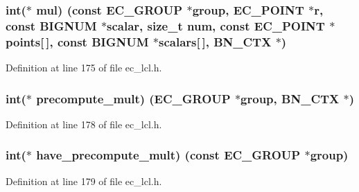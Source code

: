 \subsubsection[{\texorpdfstring{mul}{mul}}]{\setlength{\rightskip}{0pt plus 5cm}int($\ast$ mul) (const {\bf E\+C\+\_\+\+G\+R\+O\+UP} $\ast$group, {\bf E\+C\+\_\+\+P\+O\+I\+NT} $\ast$r, const {\bf B\+I\+G\+N\+UM} $\ast$scalar, size\+\_\+t {\bf num}, const {\bf E\+C\+\_\+\+P\+O\+I\+NT} $\ast$points\mbox{[}$\,$\mbox{]}, const {\bf B\+I\+G\+N\+UM} $\ast$scalars\mbox{[}$\,$\mbox{]}, {\bf B\+N\+\_\+\+C\+TX} $\ast$)}\hypertarget{structec__method__st_ababf9075864b9919d1895f11c69149bf}{}\label{structec__method__st_ababf9075864b9919d1895f11c69149bf}


Definition at line 175 of file ec\+\_\+lcl.\+h.

\subsubsection[{\texorpdfstring{precompute\+\_\+mult}{precompute_mult}}]{\setlength{\rightskip}{0pt plus 5cm}int($\ast$ precompute\+\_\+mult) ({\bf E\+C\+\_\+\+G\+R\+O\+UP} $\ast$group, {\bf B\+N\+\_\+\+C\+TX} $\ast$)}\hypertarget{structec__method__st_ab17f24e7b6c65d47964b439a704a1f78}{}\label{structec__method__st_ab17f24e7b6c65d47964b439a704a1f78}


Definition at line 178 of file ec\+\_\+lcl.\+h.

\subsubsection[{\texorpdfstring{have\+\_\+precompute\+\_\+mult}{have_precompute_mult}}]{\setlength{\rightskip}{0pt plus 5cm}int($\ast$ have\+\_\+precompute\+\_\+mult) (const {\bf E\+C\+\_\+\+G\+R\+O\+UP} $\ast$group)}\hypertarget{structec__method__st_a76a764becba4e47beebeccd6adfb22c1}{}\label{structec__method__st_a76a764becba4e47beebeccd6adfb22c1}


Definition at line 179 of file ec\+\_\+lcl.\+h.

